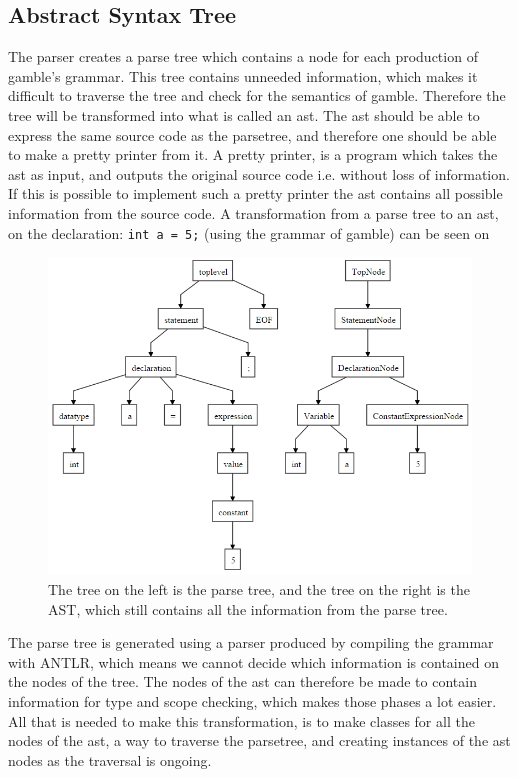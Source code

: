 \subsection*{Abstract Syntax Tree}\label{sec:AST}
The parser creates a parse tree which contains a node for each production of \gls{gamble}'s grammar.
This tree contains unneeded information, which makes it difficult to traverse the tree and check for the semantics of \gls{gamble}.
Therefore the tree will be transformed into what is called an \acrfull{ast}.
The \acrshort{ast} should be able to express the same source code as the parsetree, and therefore one should be able to make a pretty printer from it.
A pretty printer, is a program which takes the \acrshort{ast} as input, and outputs the original source code i.e. without loss of information.
If this is possible to implement such a pretty printer the \acrshort{ast} contains all possible information from the source code.
A transformation from a parse tree to an \acrshort{ast}, on the declaration: \texttt{int a = 5;} (using the grammar of \gls{gamble}) can be seen on 

\begin{figure}
		\centering
	 	\includegraphics[width=0.8\linewidth]{figures/Trees/AST.PNG}
		\caption{The tree on the left is the parse tree, and the tree on the right is the AST, which still contains all the information from the parse tree.}\label{image:AST}
\end{figure}

The parse tree is generated using a parser produced by compiling the grammar with ANTLR, which means we cannot decide which information is contained on the nodes of the tree.
The nodes of the \acrshort{ast} can therefore be made to contain information for type and scope checking, which makes those phases a lot easier.
All that is needed to make this transformation, is to make classes for all the nodes of the \acrshort{ast}, a way to traverse the parsetree, and creating instances of the \acrshort{ast} nodes as the traversal is ongoing.




